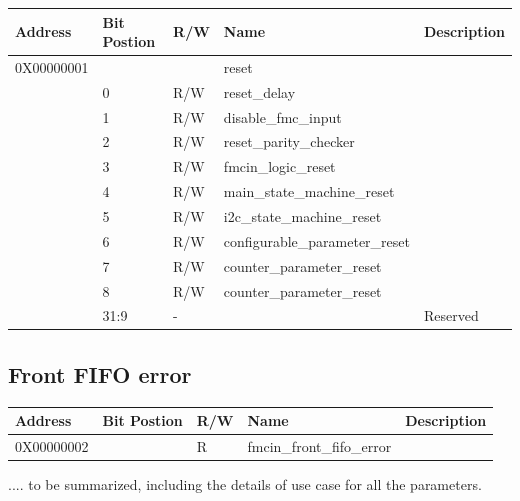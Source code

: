 \documentclass[11pt,letterpaper]{article}
\begin{document}
\begin{table}[h!]
\centering
\begin{tabular}{|l|l|l|l|l|}
\hline
Address  & Bit Postion & R/W & Name  & Description \\ \hline
0X00000001           &             &     & reset &   \\ \hline
                     & 0           & R/W & reset\_delay &  \\ \hline
                     & 1           & R/W & disable\_fmc\_input &  \\ \hline
                     & 2           & R/W & reset\_parity\_checker &  \\ \hline
                     & 3           & R/W & fmcin\_logic\_reset &  \\ \hline
                     & 4           & R/W & main\_state\_machine\_reset  &  \\ \hline
                     & 5           & R/W & i2c\_state\_machine\_reset &  \\ \hline
                     & 6           & R/W & configurable\_parameter\_reset &  \\ \hline
                     & 7           & R/W & counter\_parameter\_reset &  \\ \hline
                     & 8           & R/W & counter\_parameter\_reset &  \\ \hline
                     & 31:9        &  -  & & Reserved  \\ \hline
\end{tabular}
\end{table}

\subsection {Front FIFO error}

\begin{table}[h!]
\centering
\begin{tabular}{|l|l|l|l|l|}
\hline
Address  & Bit Postion & R/W & Name  & Description \\ \hline
0X00000002           &             & R    & fmcin\_front\_fifo\_error &   \\ \hline
\end{tabular}
\end{table}


.... to be summarized, including the details of use case for all the parameters.
\end{document}
